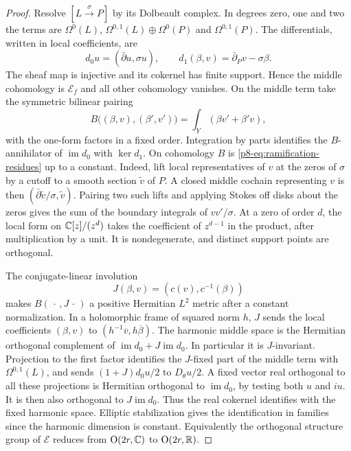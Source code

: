 \begin{proof}
Resolve \([L\xrightarrow{\sigma}P]\) by its Dolbeault complex. In
degrees zero, one and two the terms are \(\Omega^0(L)\),
\(\Omega^{0,1}(L)\oplus\Omega^0(P)\) and \(\Omega^{0,1}(P)\).
The differentials, written in local coefficients, are
\[
 d_0u=(\bar\partial u,\sigma u),\qquad
 d_1(\beta,v)=\bar\partial_Pv-\sigma\beta .
\]
The sheaf map is injective and its cokernel has finite support.
Hence the middle cohomology is \(\mathcal E_f\) and all other
cohomology vanishes. On the middle term take the symmetric bilinear
pairing
\[
     B\big((\beta,v),(\beta',v')\big)
                      =\int_Y(\beta v'+\beta'v),
\]
with the one-form factors in a fixed order. Integration by parts
identifies the \(B\)-annihilator of \(\operatorname{im}d_0\) with
\(\ker d_1\). On cohomology \(B\) is \eqref{p8-eq:ramification-residues}
up to a constant. Indeed, lift local representatives of \(v\) at the
zeros of \(\sigma\) by a cutoff to a smooth section \(\widetilde v\)
of \(P\). A closed middle cochain representing \(v\) is then
\((\bar\partial\widetilde v/\sigma,\widetilde v)\). Pairing two such
lifts and applying Stokes off disks about the zeros gives the sum of
the boundary integrals of \(vv'/\sigma\). At a zero of order \(d\),
the local form on \(\mathbb C[z]/(z^d)\) takes the coefficient of \(z^{d-1}\)
in the product, after multiplication by a unit. It is nondegenerate,
and distinct support points are orthogonal.

The conjugate-linear involution
\[
                J(\beta,v)=(c(v),c^{-1}(\beta))
\]
makes \(B(\,\cdot\,,J\,\cdot\,)\) a positive Hermitian \(L^2\)
metric after a constant normalization. In a holomorphic frame of
squared norm \(h\), \(J\) sends the local coefficients \((\beta,v)\)
to \((h^{-1}\overline v,h\overline\beta)\). The harmonic middle
space is the Hermitian orthogonal complement of
\(\operatorname{im}d_0+J\operatorname{im}d_0\). In particular it is
\(J\)-invariant. Projection to the first factor identifies the
\(J\)-fixed part of the middle term with \(\Omega^{0,1}(L)\), and
sends \((1+J)d_0u/2\) to \(D_\theta u/2\). A fixed vector real
orthogonal to all these projections is Hermitian orthogonal to
\(\operatorname{im}d_0\), by testing both \(u\) and \(iu\). It is
then also orthogonal to \(J\operatorname{im}d_0\). Thus the real
cokernel identifies with the fixed harmonic space. Elliptic
stabilization gives the identification in families since the harmonic
dimension is constant. Equivalently the orthogonal structure group of
\(\mathcal E\) reduces from \(\mathrm O(2r,\mathbb C)\) to
\(\mathrm O(2r,\mathbb R)\).


\end{proof}
